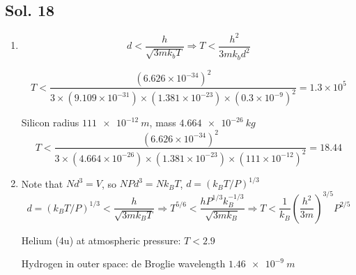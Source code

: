 \subsection*{Sol. 18}
\begin{enumerate}
    \item 
    $$
    d < \frac{h}{\sqrt{3mk_bT}} \Rightarrow
    T < \frac{h^2}{3mk_bd^2}
    $$

    $$
    T < \frac{(6.626\times10^{-34})^2}{3\times (9.109\times10^{-31})
    \times 
    (1.381\times 10^{-23})
    \times 
    (0.3\times 10^{-9})^2} = 
    1.3\times 10^5
    $$


    
    Silicon radius $\qty{111e-12}{m}$, mass
    $\qty{4.664e-26}{kg}$
    $$
    T < \frac{(6.626\times10^{-34})^2}{3\times 
    (4.664\times 10^{-26})
    \times 
    (1.381\times 10^{-23})
    \times 
    (111\times 10^{-12})^2} = 
    18.44
    $$
    \item 
    Note that $Nd^3 = V$, so $NPd^3 = Nk_B T$,
    $d = (k_B T/P)^{1/3}$
    $$
    d = (k_B T/P)^{1/3} < \frac{h}{\sqrt{3mk_B T}}
    \Rightarrow 
    T^{5/6} < \frac{hP^{1/3}k_B^{-1/3}}{\sqrt{3mk_B}}
    \Rightarrow 
    T < \frac{1}{k_B}(\frac{h^2}{3m})^{3/5}P^{2/5}
    $$

    Helium (4u) at atmospheric pressure: $T<2.9$

    Hydrogen in outer space: de Broglie wavelength $\qty{1.46e-9}{m}$
    
    
\end{enumerate}